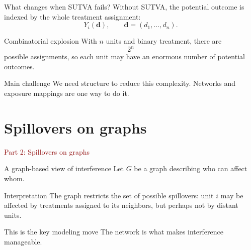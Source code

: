 \documentclass[dvipsnames,aspectratio=169,handout]{beamer}
\begin{document}
\begin{frame}{What changes when SUTVA fails?}
Without SUTVA, the potential outcome is indexed by the whole treatment assignment:
\[
Y_i(\mathbf d), \qquad \mathbf d=(d_1,\ldots,d_n).
\]

\begin{block}{Combinatorial explosion}
With $n$ units and binary treatment, there are
\[
2^n
\]
possible assignments, so each unit may have an enormous number of potential outcomes.
\end{block}

\begin{alertblock}{Main challenge}
We need structure to reduce this complexity.
Networks and exposure mappings are one way to do it.
\end{alertblock}
\end{frame}


\section{Spillovers on graphs}

\begin{frame}{}
\begin{center}
{\Huge \textcolor{DarkRed}{Part 2: Spillovers on graphs}}
\end{center}
\end{frame}

\begin{frame}{A graph-based view of interference}
Let $G$ be a graph describing who can affect whom.

\begin{center}
\end{center}

\begin{block}{Interpretation}
The graph restricts the set of possible spillovers:
unit $i$ may be affected by treatments assigned to its neighbors, but perhaps not by distant units.
\end{block}

\begin{alertblock}{This is the key modeling move}
The network is what makes interference manageable.
\end{alertblock}
\end{frame}
\end{document}

